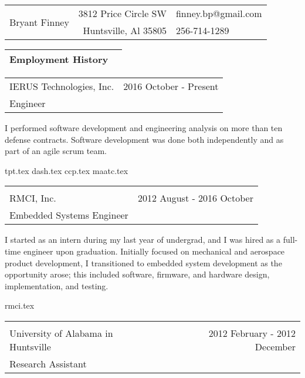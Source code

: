 \documentclass[10pt,a4paper]{article}
\begin{document}
\begin{table}
  \noindent\begin{tabularx}{\textwidth}{Xr|l}
    \toprule
    \multirow{2}{*}{\Huge Bryant Finney} & 3812 Price Circle SW & finney.bp@gmail.com \\
                                                  & Huntsville, Al 35805 & 256-714-1289 \\
    \bottomrule
  \end{tabularx}
\end{table}

\noindent\begin{tabularx}{\textwidth}{Xr}
  \Large Employment History & \\
  \bottomrule
\end{tabularx}
\smallskip

\noindent\begin{tabularx}{\textwidth}{Xr}
  IERUS Technologies, Inc. & 2016 October - Present \\
  Engineer & \\
\end{tabularx}
\smallskip

I performed software development and engineering analysis on more than ten defense
contracts. Software development was done both independently and as part of an agile
scrum team.

\bigskip

{tpt.tex}
{dash.tex}
{ccp.tex}
{maatc.tex}

\noindent\begin{tabularx}{\textwidth}{Xr}
  \Large \\ \bottomrule \\
  RMCI, Inc. & 2012 August - 2016 October \\
  Embedded Systems Engineer & \\
\end{tabularx}
\smallskip

I started as an intern during my last year of undergrad, and I was hired as a full-time
engineer upon graduation. Initially focused on mechanical and aerospace product
development, I transitioned to embedded system development as the opportunity arose; this
included software, firmware, and hardware design, implementation, and testing.

\bigskip

{rmci.tex}

\noindent\begin{tabularx}{\textwidth}{Xr}
  \Large \\ \bottomrule \\
  University of Alabama in Huntsville & 2012 February - 2012 December \\
  Research Assistant & \\
\end{tabularx}
\end{document}
